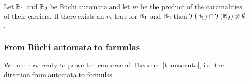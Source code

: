 
\begin{proposition}\label{PROP_Rabin_trap}
Let $\mathbb{B}_1$ and $\mathbb{B}_2$ be B\"{u}chi automata and let $m$ be the
product of the cardinalities of their carriers.
If there exists an $m$-trap for $\mathbb{B}_1$ and $\mathbb{B}_2$ then
$\mathcal{T}(\mathbb{B}_1) \cap \mathcal{T}(\mathbb{B}_2) \neq \emptyset$.
\end{proposition}


\subsubsection{From B\"{u}chi automata to formulas} \label{sec:fromBuchiToformulas}
We are now ready to prove the converse of Theorem~\ref{t:nmsoauto}, i.e. the direction from automata to formulas.


